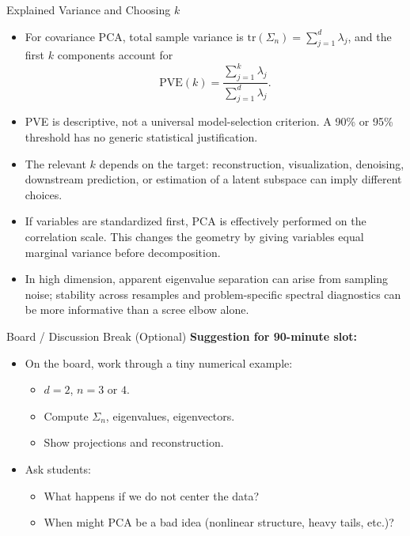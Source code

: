 \documentclass{beamer}
\newcommand{\1}{\mathbbm{1}}
\begin{document}
\begin{frame}{Explained Variance and Choosing $k$}
  \begin{itemize}
    \item For covariance PCA, total sample variance is $\mathrm{tr}(\Sigma_n)=\sum_{j=1}^d\lambda_j$, and the first $k$ components account for
      \[\mathrm{PVE}(k)=\frac{\sum_{j=1}^k\lambda_j}{\sum_{j=1}^d\lambda_j}.\]
    \item PVE is descriptive, not a universal model-selection criterion. A 90\% or 95\% threshold has no generic statistical justification.
    \item The relevant $k$ depends on the target: reconstruction, visualization, denoising, downstream prediction, or estimation of a latent subspace can imply different choices.
    \item If variables are standardized first, PCA is effectively performed on the correlation scale. This changes the geometry by giving variables equal marginal variance before decomposition.
    \item In high dimension, apparent eigenvalue separation can arise from sampling noise; stability across resamples and problem-specific spectral diagnostics can be more informative than a scree elbow alone.
  \end{itemize}
\end{frame}

\begin{frame}{Board / Discussion Break (Optional)} %
  \textbf{Suggestion for 90-minute slot:}
  \begin{itemize}
    \item On the board, work through a tiny numerical example:
    \begin{itemize}
      \item $d = 2$, $n = 3$ or $4$.
      \item Compute $\Sigma_n$, eigenvalues, eigenvectors.
      \item Show projections and reconstruction.
    \end{itemize}
    \item Ask students:
    \begin{itemize}
      \item What happens if we do not center the data?
      \item When might PCA be a bad idea (nonlinear structure, heavy tails, etc.)?
    \end{itemize}
  \end{itemize}
\end{frame}
\end{document}
